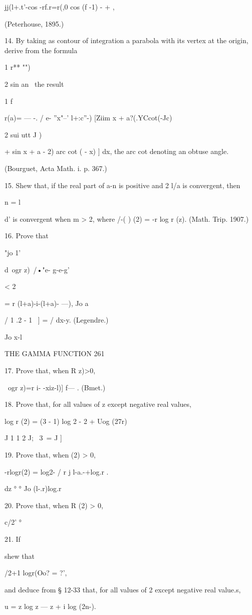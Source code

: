 jj(l+.t'-cos -rf.r=r(,0 cos (f -1) - + ,

(Peterhouse, 1895.)

14. By taking as contour of integration a parabola with its vertex at
the origin, derive from the formula

1 r** "")

2 sin an \ the result

1 f

r(a)= — -. / e- ''x"--' l+:c''-) [Ziim x + a?(.YCcot(-Jc)

2 sui utt J )

+ sin x + a - 2) arc cot ( - x) ] dx, the arc cot denoting an obtuse
angle.

(Bourguet, Acta Math. i. p. 367.)

15. Shew that, if the real part of a-n is positive and 2 l/a is
convergent, then

n = l

d' is convergent when m > 2, where \//-( ) (2) = -r log r (z). (Math.
Trip. 1907.)

16. Prove that

"jo 1'

d\ ogr z)\ /•"e- g-e-g'

< 2

= r (l+a)-i-(l+a)- ---), Jo a

/ 1 .2 - 1 \ ] = / dx-y. (Legendre.)

Jo x-l

THE GAMMA FUNCTION 261

17. Prove that, when R z)>0,

\ ogr z)=r i- -xiz-l)] f— . (Bmet.)

18. Prove that, for all values of z except negative real values,

log r (2) = (3 - 1) log 2 - 2 + Uog (27r)

J 1 1 2 J; \ 3\ = J ]

19. Prove that, when (2) > 0,

-rlogr(2) = log2- / r j l-a.-+log.r .

dz ° ° Jo (l-.r)log.r

20. Prove that, when R (2) > 0,

c/2' °

21. If

shew that

/2+1 logr(Oo? = ?',

and deduce from § 12-33 that, for all values of 2 except negative real
value.s,

u = z log z — z + i log (2n-).

